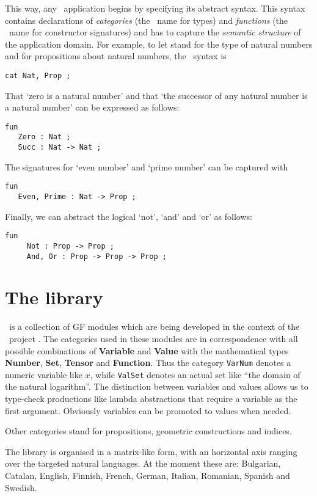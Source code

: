 \documentclass[adraft,copyright,creativecommons]{eptcs}
\begin{document}
This way, any \GF\ application begins by specifying its abstract syntax. This
syntax contains declarations of \emph{categories} (the \GF\  name for
types) and \emph{functions} (the \GF\ name for constructor signatures) and
has to capture the \emph{semantic structure} of the application domain.
For example, to let \Nat{} stand for the type of natural numbers and
\Prop{} for propositions about natural numbers, the \GF\ syntax is
\begin{lstlisting}
cat Nat, Prop ;    
\end{lstlisting}
That `zero is a natural number' and that `the successor of
any natural number is a natural number' can be expressed as follows:
\begin{lstlisting}
fun
   Zero : Nat ;
   Succ : Nat -> Nat ;
\end{lstlisting}
The signatures for `even number' and `prime number' can be captured with
\begin{lstlisting}
fun
   Even, Prime : Nat -> Prop ;	
\end{lstlisting}
Finally, we can abstract the logical `not', `and' and `or' as follows:
\begin{lstlisting}
fun
     Not : Prop -> Prop ;
     And, Or : Prop -> Prop -> Prop ;    
\end{lstlisting}




\section{The library} %
\label{sec:the_library}

\MGL\ is a collection of GF modules which are being developed in the context
of the \molto\ project \cite{molto}.
The categories used in these modules
are in correspondence with all possible combinations of \textbf{Variable}
and \textbf{Value} with the mathematical types
\textbf{Number}, \textbf{Set}, \textbf{Tensor} and \textbf{Function}.
Thus the category \texttt{VarNum} denotes a numeric
variable like $x$, while \texttt{ValSet} denotes an actual set like ``the
domain of the natural logarithm''.  The distinction between variables and
values allows us to type-check productions like lambda abstractions that
require a variable as the first argument.  Obviously variables can be
promoted to values when needed.

Other categories stand for propositions, geometric constructions and
indices.

The library is organised in a matrix-like form, with an horizontal axis
ranging over the targeted natural languages.  At the moment these are:
Bulgarian,
Catalan, English, Finnish, French, German, Italian, Romanian, Spanish and
Swedish.
\end{document}
